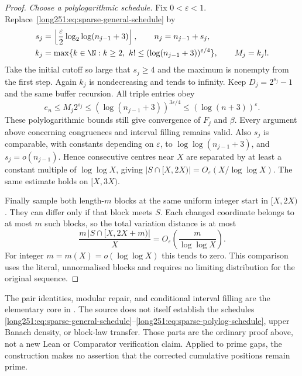 \documentclass[11pt]{article}
\begin{document}
\begin{proof}
\emph{Choose a polylogarithmic schedule.}
Fix $0<\varepsilon<1$.  Replace~\eqref{long251:eq:sparse-general-schedule} by
\begin{equation}\label{long251:eq:sparse-polylog-schedule}
 \begin{split}
 s_j&=\left\lfloor\frac{\varepsilon}{2}
          \log_2\log(n_{j-1}+3)\right\rfloor,\qquad n_j=n_{j-1}+s_j,\\
 k_j&=\max\{k\in\N:k\ge2,\ k!\le(\log(n_{j-1}+3))^{\varepsilon/4}\},
 \qquad M_j=k_j!.
 \end{split}
\end{equation}
Take the initial cutoff so large that $s_j\ge4$ and the maximum is nonempty
from the first step.  Again $k_j$ is nondecreasing and tends to infinity.
Keep $D_j=2^{s_j}-1$ and the same buffer recursion.  All triple entries obey
\[
 e_n\le M_j2^{s_j}\le(\log(n_{j-1}+3))^{3\varepsilon/4}
 \le(\log(n+3))^\varepsilon.
\]
These polylogarithmic bounds still give convergence of $F_j$ and $\beta$.
Every argument above concerning congruences and interval filling remains
valid.  Also $s_j$ is comparable, with constants depending on $\varepsilon$,
to $\log\log(n_{j-1}+3)$, and $s_j=o(n_{j-1})$.  Hence consecutive centres
near $X$ are separated by at least a constant multiple of
$\log\log X$, giving $|S\cap[X,2X)|=O_\varepsilon(X/\log\log X)$.
The same estimate holds on $[X,3X)$.

Finally sample both length-$m$ blocks at the same uniform integer start in
$[X,2X)$.  They can differ only if that block meets $S$.  Each changed
coordinate belongs to at most $m$ such blocks, so the total variation
distance is at most
\[
 \frac{m\,|S\cap[X,2X+m)|}{X}
 =O_\varepsilon\!\left(\frac{m}{\log\log X}\right).
\]
For integer $m=m(X)=o(\log\log X)$ this tends to zero.  This comparison
uses the literal, unnormalised blocks and requires no limiting distribution
for the original sequence.
\end{proof}

The pair identities, modular repair, and conditional interval filling are the
elementary core in
.
The source does not itself establish the schedules
\eqref{long251:eq:sparse-general-schedule}--\eqref{long251:eq:sparse-polylog-schedule},
upper Banach density, or block-law transfer.  Those parts are the ordinary
proof above, not a new Lean or Comparator verification claim.  Applied to
prime gaps, the construction makes no assertion that the corrected
cumulative positions remain prime.
\end{document}
